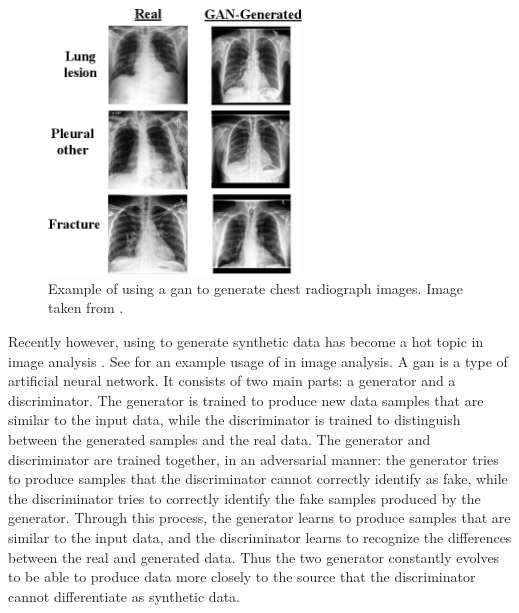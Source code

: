 \documentclass[12pt, letterpaper]{article}
\begin{document}
\begin{figure}[t]
    \centering
    \includegraphics[width=0.6\textwidth]{figures/gan-xray.png}
    \caption{Example of using a \acrfull{gan} to generate chest radiograph images. Image taken from \cite{sundaram_gan-based_2021}.}
    \label{fig:gan-xray}
\end{figure}

Recently however, using  to generate synthetic data has become a hot topic in image analysis \cite{}. See  for an example usage of  in image analysis. A \acrshort{gan} is a type of artificial neural network. It consists of two main parts: a generator and a discriminator. The generator is trained to produce new data samples that are similar to the input data, while the discriminator is trained to distinguish between the generated samples and the real data. The generator and discriminator are trained together, in an adversarial manner: the generator tries to produce samples that the discriminator cannot correctly identify as fake, while the discriminator tries to correctly identify the fake samples produced by the generator. Through this process, the generator learns to produce samples that are similar to the input data, and the discriminator learns to recognize the differences between the real and generated data. Thus the two generator constantly evolves to be able to produce data more closely to the source that the discriminator cannot differentiate as synthetic data.


\end{document}
